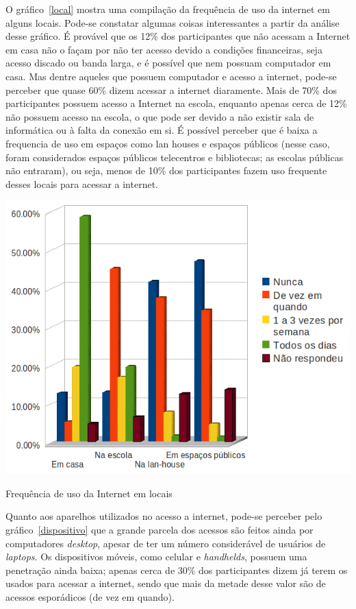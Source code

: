     O gráfico~\ref{local} mostra uma compilação da frequência de uso da internet em alguns locais. Pode-se constatar algumas coisas interessantes a partir da análise desse gráfico. É provável que os 12\% dos participantes que não acessam a Internet em casa não o façam por não ter acesso devido a condições financeiras, seja acesso discado ou banda larga, e é possível que nem possuam computador em casa. Mas dentre aqueles que possuem computador e acesso a internet, pode-se perceber que quase 60\% dizem acessar a internet diaramente. Mais de 70\% dos participantes possuem acesso a Internet na escola, enquanto apenas cerca de 12\% não possuem acesso na escola, o que pode ser devido a não existir sala de informática ou à falta da conexão em si. É possível perceber que é baixa a frequencia de uso em espaços como lan houses e espaços públicos (nesse caso, foram considerados espaços públicos telecentros e bibliotecas; as escolas públicas não entraram), ou seja, menos de 10\% dos participantes fazem uso frequente desses locais para acessar a internet.

    \begin{grafico}
        \begin{center}
    \includegraphics[width=0.7\linewidth]{arquivos/local.png}
        \end{center}
        \caption{Frequência de uso da Internet em locais}
        \label{local}
    \end{grafico}

    Quanto aos aparelhos utilizados no acesso a internet, pode-se perceber pelo gráfico~\ref{dispositivo} que a grande parcela dos acessos são feitos ainda por computadores \textit{desktop}, apesar de ter um número considerável de usuários de \textit{laptops}. Os dispositivos móveis, como celular e \textit{handhelds}, possuem uma penetração ainda baixa; apenas cerca de 30\% dos participantes dizem já terem os usados para acessar a internet, sendo que mais da metade desse valor são de acessos esporádicos (de vez em quando).

